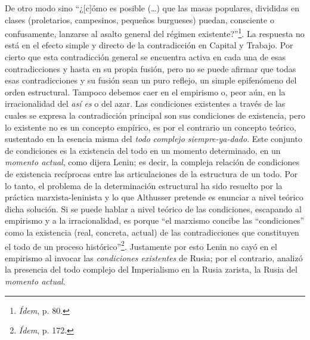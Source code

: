De otro modo sino \enquote{¿{[}c{]}ómo es posible (\dots) que las masas
populares, divididas en clases (proletarios, campesinos, pequeños
burgueses) puedan, consciente o confusamente, lanzarse al asalto general
del régimen existente?}\footnote{\emph{Ídem}, p. 80.}. La respuesta no
está en el efecto simple y directo de la contradicción en Capital y
Trabajo. Por cierto que esta contradicción general se encuentra activa
en cada una de esas contradicciones y hasta en su propia fusión, pero no
se puede afirmar que todas esas contradicciones y su fusión sean un puro
reflejo, un simple epifenómeno del orden estructural. Tampoco debemos
caer en el empirismo o, peor aún, en la irracionalidad del \emph{así es}
o del azar. Las condiciones existentes a través de las cuales se expresa
la contradicción principal son sus condiciones de existencia, pero lo
existente no es un concepto empírico, es por el contrario un concepto
teórico, sustentado en la esencia misma del \emph{todo complejo
siempre-ya-dado}. Este conjunto de condiciones es la existencia del todo
en un momento determinado, en un \emph{momento actual}, como dijera
Lenin; es decir, la compleja relación de condiciones de existencia
recíprocas entre las articulaciones de la estructura de un todo. Por lo
tanto, el problema de la determinación estructural ha sido resuelto por
la práctica marxista-leninista y lo que Althusser pretende es enunciar a
nivel teórico dicha solución. Si se puede hablar a nivel teórico de las
condiciones, escapando al empirismo y a la irracionalidad, es porque \enquote{el
marxismo concibe las ``condiciones'' como la existencia (real, concreta,
actual) de las contradicciones que constituyen el todo de un proceso
histórico}\footnote{\emph{Ídem}, p. 172.}. Justamente por esto Lenin no
cayó en el empirismo al invocar las \emph{condiciones existentes} de
Rusia; por el contrario, analizó la presencia del todo complejo del
Imperialismo en la Rusia zarista, la Rusia del \emph{momento actual}.

